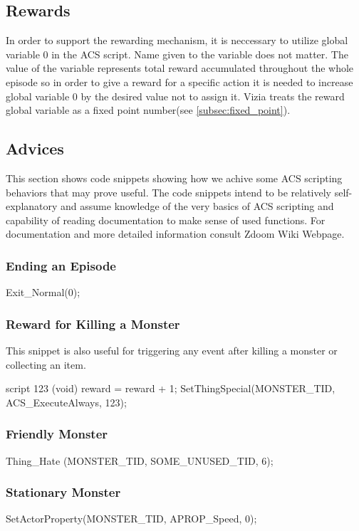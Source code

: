 	\subsection{Rewards}
		In order to support the rewarding mechanism, it is neccessary to utilize global variable 0 in the ACS script. Name given to the variable does not matter. The value of the variable represents total reward accumulated throughout the whole episode so in order to give a reward for a specific action it is needed to increase global variable 0 by the desired value not to assign it. Vizia treats the reward global variable as a fixed point number(see \ref{subsec:fixed_point}).

	\subsection{Advices}
		This section shows code snippets showing how we achive some ACS scripting behaviors that may prove useful. The code snippets intend to be relatively self-explanatory and assume knowledge of the very basics of ACS scripting and capability of reading documentation to make sense of used functions. For documentation and more detailed information consult Zdoom Wiki Webpage\cite{zdoom-wiki}.

		\subsubsection*{Ending an Episode}

			\begin{clinee}
Exit_Normal(0);
			\end{clinee}
		\subsubsection*{Reward for Killing a Monster} This snippet is also useful for triggering any event after killing a monster or collecting an item.
			\begin{clinee}
script 123 (void)
{
	reward = reward + 1;
}
SetThingSpecial(MONSTER_TID, ACS_ExecuteAlways, 123);
			\end{clinee}
\subsubsection*{Friendly Monster}
			\begin{clinee}
Thing_Hate (MONSTER_TID, SOME_UNUSED_TID, 6);
			\end{clinee}
		\subsubsection*{Stationary Monster}
			\begin{clinee}
SetActorProperty(MONSTER_TID, APROP_Speed, 0);
			\end{clinee}
